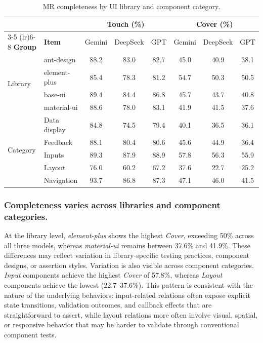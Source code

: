 \begin{table}[h]
\centering
\caption{MR completeness by UI library and component category.}
\label{tab:completeness}
\setlength{\tabcolsep}{2pt}
\begin{tabular}{l l ccc ccc}
\toprule
 &  & \multicolumn{3}{c}{\textbf{Touch} (\%)} & \multicolumn{3}{c}{\textbf{Cover} (\%)} \\
\cmidrule(lr){3-5} \cmidrule(lr){6-8}
\textbf{Group} & \textbf{Item} & Gemini & DeepSeek & GPT & Gemini & DeepSeek & GPT \\
\midrule
\multirow{4}{*}{Library} 
 &  ant-design                           & 88.2 & 83.0 & 82.7 & 45.0 & 40.9 & 38.1 \\
 & element-plus                        & 85.4 & 78.3 & 81.2 & 54.7 & 50.3 & 50.5 \\
 &  base-ui                             & 89.4 & 84.4 & 86.8 & 45.7 & 43.7 & 40.8 \\
 & material-ui                         & 88.6 & 78.0 & 83.1 & 41.9 & 41.5 & 37.6 \\
\midrule
\multirow{5}{*}{Category}
 &  Data display                        & 84.8 & 74.5 & 79.4 & 40.1 & 36.5 & 36.1 \\
 & Feedback                            & 88.1 & 80.4 & 80.6 & 45.6 & 44.9 & 36.4 \\
 &  Inputs                               & 89.3 & 87.9 & 88.9 & 57.8 & 56.3 & 55.9 \\
 & Layout                              & 76.0 & 60.2 & 67.2 & 37.6 & 22.7 & 25.2 \\
 &  Navigation                           & 93.7 & 86.8 & 87.3 & 47.1 & 46.0 & 41.5 \\
\bottomrule
\end{tabular}
\end{table}


\subsubsection{Completeness varies across libraries and component categories.} At the library level, \textit{element-plus} shows the highest \textit{Cover}, exceeding 50\% across all three models, whereas \textit{material-ui} remains between 37.6\% and 41.9\%. These differences may reflect variation in library-specific testing practices, component designs, or assertion styles.
Variation is also visible across component categories. \textit{Input} components achieve the highest \textit{Cover} of 57.8\%, whereas \textit{Layout} components achieve the lowest (22.7--37.6\%). This pattern is consistent with the nature of the underlying behaviors: input-related relations often expose explicit state transitions, validation outcomes, and callback effects that are straightforward to assert, while layout relations more often involve visual, spatial, or responsive behavior that may be harder to validate through conventional component tests.



